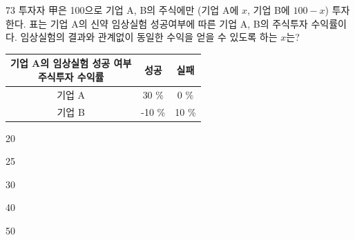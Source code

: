 \begin{question}{73}
투자자 甲은 100으로 기업 A, B의 주식에만 (기업 A에 $x$, 기업 B에 $100-x$) 투자한다. 표는 기업 A의 신약 임상실험 성공여부에 따른 기업 A, B의 주식투자 수익률이다. 임상실험의 결과와 관계없이 동일한 수익을 얻을 수 있도록 하는 $x$는?
\par
{\small\centering
\begin{tabular}{|c|c|c|}\hline
\makecell[l]{\hspace*{5em}기업 A의 임상실험 성공 여부\\ 주식투자 수익률} & 성공 & 실패\\\hline
기업 A & 30 \% & 0 \%\\\hline
기업 B & -10 \% & 10 \%\\\hline
\end{tabular}\par}
\begin{choices}
  \item 20
  \item 25
  \item 30
  \item 40
  \item 50
\end{choices}
\end{question}
